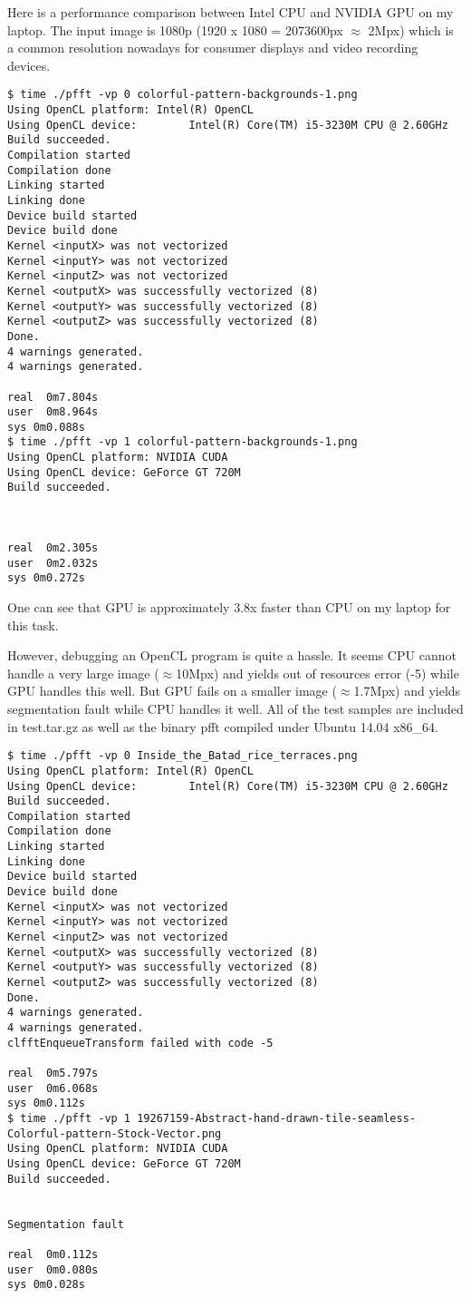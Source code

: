 \documentclass{article}
\begin{document}
  Here is a performance comparison between Intel CPU and NVIDIA GPU on my laptop. The input image is 1080p
  (1920 x 1080 = 2073600px $\approx$ 2Mpx) which is a common resolution nowadays for consumer displays and video
  recording devices.

  \begin{lstlisting}
$ time ./pfft -vp 0 colorful-pattern-backgrounds-1.png 
Using OpenCL platform: Intel(R) OpenCL
Using OpenCL device:        Intel(R) Core(TM) i5-3230M CPU @ 2.60GHz
Build succeeded.
Compilation started
Compilation done
Linking started
Linking done
Device build started
Device build done
Kernel <inputX> was not vectorized
Kernel <inputY> was not vectorized
Kernel <inputZ> was not vectorized
Kernel <outputX> was successfully vectorized (8)
Kernel <outputY> was successfully vectorized (8)
Kernel <outputZ> was successfully vectorized (8)
Done.
4 warnings generated.
4 warnings generated.

real  0m7.804s
user  0m8.964s
sys 0m0.088s
$ time ./pfft -vp 1 colorful-pattern-backgrounds-1.png 
Using OpenCL platform: NVIDIA CUDA
Using OpenCL device: GeForce GT 720M
Build succeeded.



real  0m2.305s
user  0m2.032s
sys 0m0.272s
  \end{lstlisting}

  One can see that GPU is approximately 3.8x faster than CPU on my laptop for this task.

  However, debugging an OpenCL program is quite a hassle. It seems CPU cannot handle a very large image
  ($\approx$10Mpx) and yields out of resources error (-5) while GPU handles this well. But GPU fails on a smaller image
  ($\approx$1.7Mpx) and yields segmentation fault while CPU handles it well. All of the test samples are included in
  test.tar.gz as well as the binary pfft compiled under Ubuntu 14.04 x86\_64.

  \begin{lstlisting}
$ time ./pfft -vp 0 Inside_the_Batad_rice_terraces.png 
Using OpenCL platform: Intel(R) OpenCL
Using OpenCL device:        Intel(R) Core(TM) i5-3230M CPU @ 2.60GHz
Build succeeded.
Compilation started
Compilation done
Linking started
Linking done
Device build started
Device build done
Kernel <inputX> was not vectorized
Kernel <inputY> was not vectorized
Kernel <inputZ> was not vectorized
Kernel <outputX> was successfully vectorized (8)
Kernel <outputY> was successfully vectorized (8)
Kernel <outputZ> was successfully vectorized (8)
Done.
4 warnings generated.
4 warnings generated.
clfftEnqueueTransform failed with code -5

real  0m5.797s
user  0m6.068s
sys 0m0.112s
$ time ./pfft -vp 1 19267159-Abstract-hand-drawn-tile-seamless-Colorful-pattern-Stock-Vector.png 
Using OpenCL platform: NVIDIA CUDA
Using OpenCL device: GeForce GT 720M
Build succeeded.


Segmentation fault

real  0m0.112s
user  0m0.080s
sys 0m0.028s
  \end{lstlisting}
\end{document}
